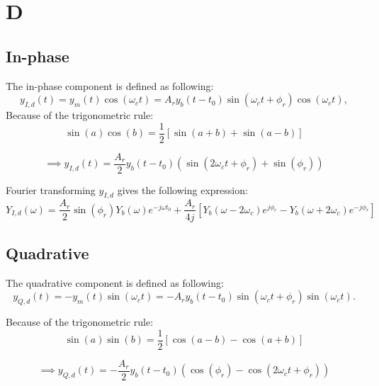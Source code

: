 \documentclass{article}[11]
\begin{document}
\section{D}

\subsection{In-phase}
The in-phase component is defined as following:
\begin{equation}
    y_{I,d}(t) = y_m(t) \cos(\omega_c t) = A_r y_b(t - t_0) \sin(\omega_c t + \phi_r) \cos(\omega_c t), \tag{2a}
\end{equation}
Because of the trigonometric rule:
\begin{equation}
    \sin(a) \cos(b) = \frac{1}{2} \left[ \sin(a + b) + \sin(a - b) \right]
\end{equation}

\begin{equation}
 \implies y_{I, d}(t) = \frac{A_r}{2} y_b(t - t_0) \left( \sin(2\omega_c t + \phi_r) + \sin(\phi_r) \right)
\end{equation}

Fourier transforming $y_{I, d}$ gives the following expression:
\begin{equation}
Y_{I, d}(\omega) = \frac{A_r}{2} \sin(\phi_r) Y_b(\omega) e^{-j \omega t_0} + \frac{A_r}{4j} \left[ Y_b(\omega - 2\omega_c)e^{j \phi_r} - Y_b(\omega + 2\omega_c)e^{-j \phi_r} \right]
\end{equation}


\subsection{Quadrative}
The quadrative component is defined as following:
\begin{equation}
    y_{Q,d}(t) = -y_m(t) \sin(\omega_c t) = -A_r y_b(t - t_0) \sin(\omega_c t + \phi_r) \sin(\omega_c t).
\end{equation}

Because of the trigonometric rule:
\begin{equation}
    \sin(a) \sin(b) = \frac{1}{2} \left[ \cos(a - b) - \cos(a + b) \right]
\end{equation}

\begin{equation}
\implies
y_{Q, d}(t) = -\frac{A_r}{2} y_b(t - t_0) \left( \cos(\phi_r) - \cos(2\omega_c t + \phi_r) \right)
\end{equation}
\end{document}
